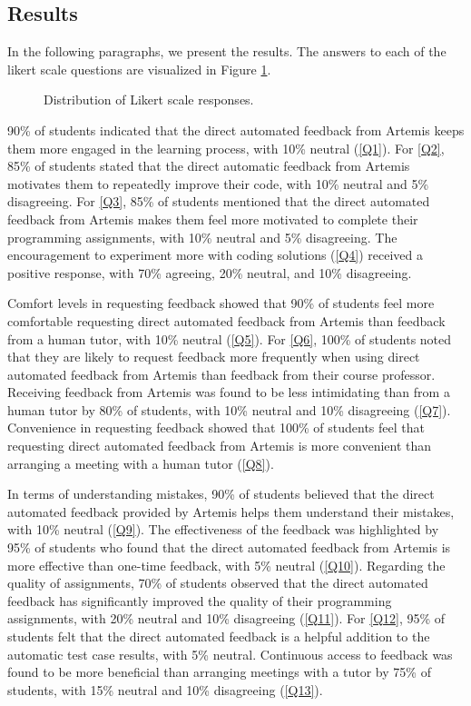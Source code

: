 \documentclass[manuscript,screen,review]{acmart}
\begin{document}
\subsection{Results}

In the following paragraphs, we present the results. 
The answers to each of the likert scale questions are visualized in Figure \ref{fig:Survey-Results}.

\begin{figure}[htpb]
  \centering
  \resizebox{0.8\textwidth}{!}{
    
  }
  \caption[Distribution of Likert scale responses]{Distribution of Likert scale responses.}
  \label{fig:Survey-Results}
\end{figure}


90\% of students indicated that the direct automated feedback from Artemis keeps them more engaged in the learning process, with 10\% neutral (\ref{Q1}).
For \ref{Q2}, 85\% of students stated that the direct automatic feedback from Artemis motivates them to repeatedly improve their code, with 10\% neutral and 5\% disagreeing.
For \ref{Q3}, 85\% of students mentioned that the direct automated feedback from Artemis makes them feel more motivated to complete their programming assignments, with 10\% neutral and 5\% disagreeing.
The encouragement to experiment more with coding solutions (\ref{Q4}) received a positive response, with 70\% agreeing, 20\% neutral, and 10\% disagreeing.


Comfort levels in requesting feedback showed that 90\% of students feel more comfortable requesting direct automated feedback from Artemis than feedback from a human tutor, with 10\% neutral (\ref{Q5}).
For \ref{Q6}, 100\% of students noted that they are likely to request feedback more frequently when using direct automated feedback from Artemis than feedback from their course professor.
Receiving feedback from Artemis was found to be less intimidating than from a human tutor by 80\% of students, with 10\% neutral and 10\% disagreeing (\ref{Q7}).
Convenience in requesting feedback showed that 100\% of students feel that requesting direct automated feedback from Artemis is more convenient than arranging a meeting with a human tutor (\ref{Q8}).


In terms of understanding mistakes, 90\% of students believed that the direct automated feedback provided by Artemis helps them understand their mistakes, with 10\% neutral (\ref{Q9}).
The effectiveness of the feedback was highlighted by 95\% of students who found that the direct automated feedback from Artemis is more effective than one-time feedback, with 5\% neutral (\ref{Q10}).
Regarding the quality of assignments, 70\% of students observed that the direct automated feedback has significantly improved the quality of their programming assignments, with 20\% neutral and 10\% disagreeing (\ref{Q11}).
For \ref{Q12}, 95\% of students felt that the direct automated feedback is a helpful addition to the automatic test case results, with 5\% neutral.
Continuous access to feedback was found to be more beneficial than arranging meetings with a tutor by 75\% of students, with 15\% neutral and 10\% disagreeing (\ref{Q13}).
\end{document}

